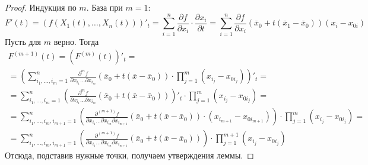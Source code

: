 \begin{proof}
    Индукция по $m$. База при $m=1$:
    \[F'(t)=(f(X_1(t),\dots,X_n(t)))'_t=\sum\limits_{i=1}^{n}\frac{\partial {f}}{\partial {x_i}}\cdot \frac{\partial {x_i}}{\partial {t}}=\sum\limits_{i=1}^{n}\frac{\partial {f}}{\partial {x_i}}(\bar{x}_0+t(\bar{x}_1-\bar{x}_0))(x_i-x_{0i})\]
    Пусть для $m$ верно. Тогда 
    \begin{multline*}
        F^{(m+1)}(t)=(F^{(m)}(t))'_t=\\
        =\left(\sum\limits_{i_1,\dots,i_m=1}^{n} \frac{\partial^m {f}}{\partial {x_{i_1}}\dots \partial x_{i_m}}(\bar{x}_0+t(\bar{x}-\bar{x}_0))\cdot \prod\limits_{j=1}^{m}(x_{i_j}-x_{0i_j})\right)'_t=\\
        =\sum\limits_{i_1,\dots,i_m=1}^{n} \left(\frac{\partial^m {f}}{\partial {x_{i_1}}\dots \partial x_{i_m}}(\bar{x}_0+t(\bar{x}-\bar{x}_0))\right)'_t\cdot \prod\limits_{j=1}^{m}(x_{i_j}-x_{0i_j})=\\
        =\sum\limits_{i_1,\dots,i_m,i_{m+1}=1}^{n} \left(\frac{\partial^{(m+1)} {f}}{\partial {x_{i_1}}\dots \partial x_{i_m} \partial x_{i_{m+1}}}(\bar{x}_0+t(\bar{x}-\bar{x}_0))\cdot (x_{i_{m+1}}-x_{0i_{m+1}})\right)\cdot \prod\limits_{j=1}^{m}(x_{i_j}-x_{0i_j})=\\
    =\sum\limits_{i_1,\dots,i_m,i_{m+1}=1}^{n} \left(\frac{\partial^{(m+1)} {f}}{\partial {x_{i_1}}\dots \partial x_{i_m} \partial x_{i_{m+1}}}(\bar{x}_0+t(\bar{x}-\bar{x}_0))\right)\cdot \prod\limits_{j=1}^{m+1}(x_{i_j}-x_{0i_j})
    \end{multline*}
    Отсюда, подставив нужные точки, получаем утверждения леммы.
\end{proof} 